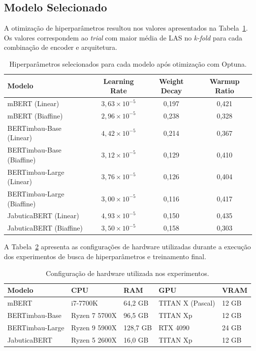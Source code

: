 \subsection*{Modelo Selecionado}

A otimização de hiperparâmetros resultou nos valores apresentados na
Tabela~\ref{tab:hiperparametros_modelos}. Os valores correspondem ao \textit{trial} com maior
média de LAS no \textit{k-fold} para cada combinação de encoder e arquitetura.

\begin{table}[h]
\centering
\setlength{\tabcolsep}{8pt}
\caption{Hiperparâmetros selecionados para cada modelo após otimização com Optuna.}
\label{tab:hiperparametros_modelos}
\begin{tabular}{lccc}
\toprule
\textbf{Modelo} & \textbf{Learning Rate} & \textbf{Weight Decay} & \textbf{Warmup Ratio} \\
\midrule
mBERT (Linear)              & $3{,}63 \times 10^{-5}$ & 0,197 & 0,421 \\
mBERT (Biaffine)            & $2{,}96 \times 10^{-5}$ & 0,238 & 0,328 \\
BERTimbau-Base (Linear)     & $4{,}42 \times 10^{-5}$ & 0,214 & 0,367 \\
BERTimbau-Base (Biaffine)   & $3{,}12 \times 10^{-5}$ & 0,129 & 0,410 \\
BERTimbau-Large (Linear)    & $3{,}76 \times 10^{-5}$ & 0,126 & 0,404 \\
BERTimbau-Large (Biaffine)  & $3{,}00 \times 10^{-5}$ & 0,116 & 0,417 \\
JabuticaBERT (Linear)       & $4{,}93 \times 10^{-5}$ & 0,150 & 0,435 \\
JabuticaBERT (Biaffine)     & $3{,}50 \times 10^{-5}$ & 0,158 & 0,303 \\
\bottomrule
\end{tabular}
\end{table}

A Tabela~\ref{tab:hardware} apresenta as configurações de hardware utilizadas durante a
execução dos experimentos de busca de hiperparâmetros e treinamento final.

\begin{table}[t]
\centering
\setlength{\tabcolsep}{10pt}
\caption{Configuração de hardware utilizada nos experimentos.}
\label{tab:hardware}
\begin{tabular}{lllll}
\hline
\textbf{Modelo} & \textbf{CPU} & \textbf{RAM} & \textbf{GPU} & \textbf{VRAM} \\
\hline
mBERT              & i7-7700K         & 64,2 GB & TITAN X (Pascal) & 12 GB \\
BERTimbau-Base     & Ryzen 7 5700X    & 96,5 GB & TITAN Xp         & 12 GB \\
BERTimbau-Large    & Ryzen 9 5900X    & 128,7 GB & RTX 4090        & 24 GB \\
JabuticaBERT       & Ryzen 5 2600X    & 16,0 GB & TITAN Xp         & 12 GB \\
\hline
\end{tabular}
\end{table}

